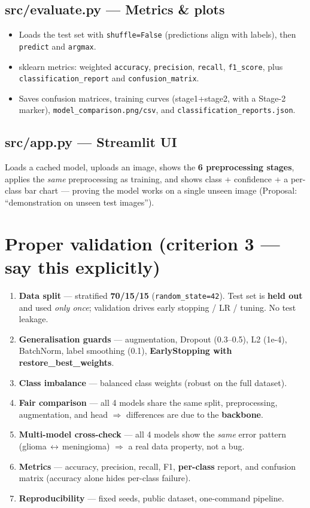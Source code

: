 \documentclass[11pt,a4paper]{article}
\newcommand{\code}[1]{\colorbox{codebg}{\small\texttt{#1}}}
\begin{document}
\subsection{src/evaluate.py --- Metrics \& plots}
\begin{itemize}[leftmargin=*,itemsep=1pt]
  \item Loads the test set with \texttt{shuffle=False} (predictions align with labels), then \texttt{predict} and \texttt{argmax}.
  \item sklearn metrics: weighted \texttt{accuracy}, \texttt{precision}, \texttt{recall}, \texttt{f1\_score}, plus \texttt{classification\_report} and \texttt{confusion\_matrix}.
  \item Saves confusion matrices, training curves (stage1+stage2, with a Stage-2 marker), \texttt{model\_comparison.png/csv}, and \texttt{classification\_reports.json}.
\end{itemize}

\subsection{src/app.py --- Streamlit UI}
Loads a cached model, uploads an image, shows the \textbf{6 preprocessing stages}, applies the \emph{same}
preprocessing as training, and shows class + confidence + a per-class bar chart --- proving the model works on a
single unseen image (Proposal: ``demonstration on unseen test images'').

\section{Proper validation (criterion 3 --- say this explicitly)}
\begin{enumerate}[leftmargin=*,itemsep=2pt]
  \item \textbf{Data split} --- stratified \textbf{70/15/15} (\code{random\_state=42}). Test set is \textbf{held out} and used \emph{only once}; validation drives early stopping / LR / tuning. No test leakage.
  \item \textbf{Generalisation guards} --- augmentation, Dropout (0.3--0.5), L2 (1e-4), BatchNorm, label smoothing (0.1), \textbf{EarlyStopping with restore\_best\_weights}.
  \item \textbf{Class imbalance} --- balanced class weights (robust on the full dataset).
  \item \textbf{Fair comparison} --- all 4 models share the same split, preprocessing, augmentation, and head $\Rightarrow$ differences are due to the \textbf{backbone}.
  \item \textbf{Multi-model cross-check} --- all 4 models show the \emph{same} error pattern (glioma\,$\leftrightarrow$\,meningioma) $\Rightarrow$ a real data property, not a bug.
  \item \textbf{Metrics} --- accuracy, precision, recall, F1, \textbf{per-class} report, and confusion matrix (accuracy alone hides per-class failure).
  \item \textbf{Reproducibility} --- fixed seeds, public dataset, one-command pipeline.
\end{enumerate}
\end{document}
